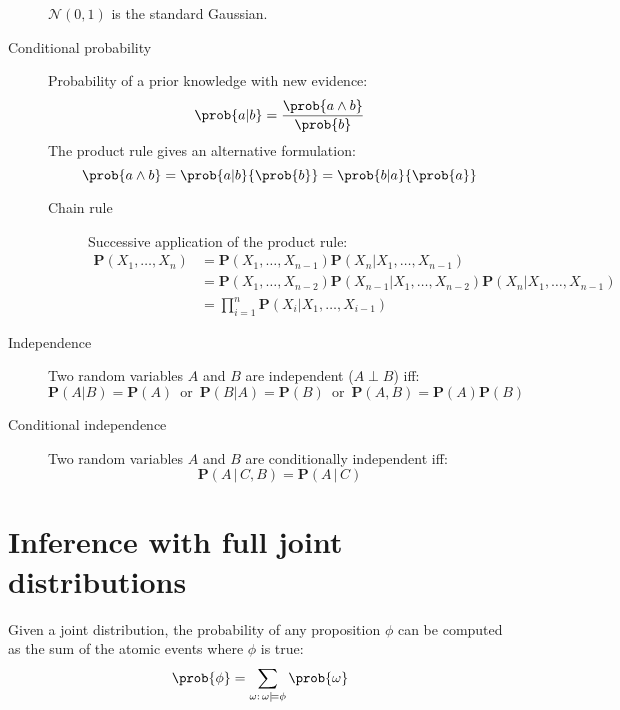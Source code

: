 \begin{description}
\begin{descriptionlist}
                $\mathcal{N}(0, 1)$ is the standard Gaussian.
        \end{descriptionlist}

    \item[Conditional probability] 
        Probability of a prior knowledge with new evidence:
        \[ \prob{a \vert b} = \frac{\prob{a \land b}}{\prob{b}} \]
        The product rule gives an alternative formulation:
        \[ \prob{a \land b} = \prob{a \vert b}{\prob{b}} = \prob{b \vert a}{\prob{a}} \]

        \begin{description}
            \item[Chain rule] 
                Successive application of the product rule:
                \[ 
                    \begin{split}
                        \textbf{P}(X_1, \dots, X_n) &= \textbf{P}(X_1, \dots, X_{n-1}) \textbf{P}(X_n \vert X_1, \dots, X_{n-1}) \\
                            &= \textbf{P}(X_1, \dots, X_{n-2}) \textbf{P}(X_{n-1} \vert X_1, \dots, X_{n-2}) \textbf{P}(X_n \vert X_1, \dots, X_{n-1}) \\
                            &= \prod_{i=1}^{n} \textbf{P}(X_i \vert X_1, \dots, X_{i-1})
                    \end{split}  
                \]
        \end{description}

    \item[Independence] 
        Two random variables $A$ and $B$ are independent ($A \perp B$) iff:
        \[ 
            \textbf{P}(A \vert B) = \textbf{P}(A) \,\text{ or }\, 
            \textbf{P}(B \vert A) = \textbf{P}(B) \,\text{ or }\,
            \textbf{P}(A, B) = \textbf{P}(A)\textbf{P}(B)
        \]

    \item[Conditional independence] 
        Two random variables $A$ and $B$ are conditionally independent iff:
        \[ \textbf{P}(A \,\vert\, C, B) = \textbf{P}(A \,\vert\, C) \]
\end{description}



\section{Inference with full joint distributions}
Given a joint distribution, the probability of any proposition $\phi$ 
can be computed as the sum of the atomic events where $\phi$ is true:
\[ \prob{\phi} = \sum_{\omega:\, \omega \models \phi} \prob{\omega} \]

